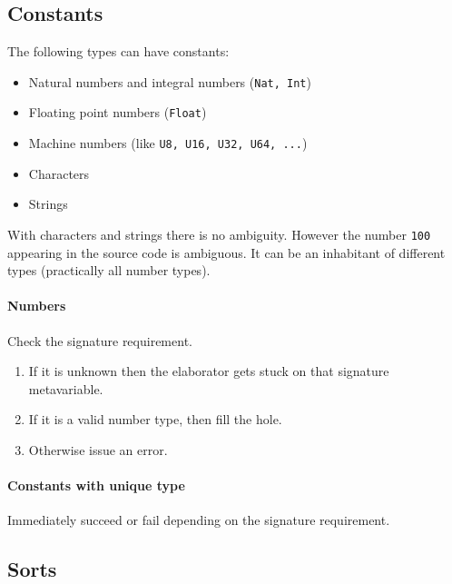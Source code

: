 \subsection{Constants}

The following types can have constants:
\begin{itemize}
    \item Natural numbers and integral numbers ({\tt Nat, Int})
    \item Floating point numbers ({\tt Float})
    \item Machine numbers (like {\tt U8, U16, U32, U64, ...})
    \item Characters
    \item Strings
\end{itemize}

With characters and strings there is no ambiguity. However the number {\tt 100}
appearing in the source code is ambiguous. It can be an inhabitant of different
types (practically all number types).

\paragraph{Numbers} Check the signature requirement.
\begin{enumerate}
    \item  If it is unknown then the elaborator
        gets stuck on that signature metavariable.

    \item If it is a valid number type, then fill the hole.

    \item Otherwise issue an error.
\end{enumerate}


\paragraph{Constants with unique type} Immediately succeed or fail depending on
the signature requirement.








\subsection{Sorts}

